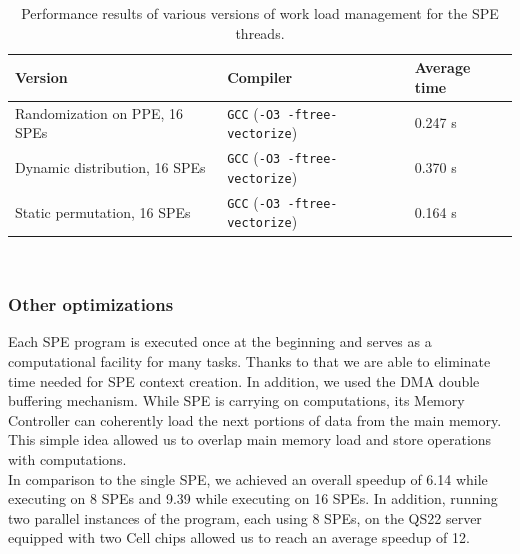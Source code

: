 \begin{table}[htb]
\begin{footnotesize}
\caption{Performance results of various versions of work load management for the SPE threads.}
\label{tab:t2}
\newcommand{\m}{\hphantom{$-$}}
\newcommand{\cc}[1]{\multicolumn{1}{c}{#1}}
\renewcommand{\tabcolsep}{0.5pc} %
\renewcommand{\arraystretch}{1.2} %
\begin{tabular}{@{}lll}
\hline
\textbf{Version} & \textbf{Compiler} & \textbf{Average time} \\
\hline
Randomization on PPE, 16 SPEs & \texttt{GCC} (\texttt{-O3 -ftree-vectorize}) & 0.247 s \\
Dynamic distribution, 16 SPEs & \texttt{GCC} (\texttt{-O3 -ftree-vectorize}) &  0.370 s \\
Static permutation, 16 SPEs & \texttt{GCC} (\texttt{-O3 -ftree-vectorize}) & 0.164 s \\
\hline
\end{tabular}\\[2pt]
\end{footnotesize}
\end{table}

\subsubsection{Other optimizations}
Each SPE program is executed once at the beginning and serves as a computational
facility for many tasks.
Thanks to that we are able to eliminate time needed for SPE context creation.
In addition, we used the DMA double buffering
mechanism.
While SPE is carrying on computations, its Memory Controller can coherently load
the next portions of data from the main memory.
This simple idea allowed us to overlap main memory load and store operations with computations.\\
In comparison to the single SPE, we achieved an overall speedup of 6.14 while
executing on 8 SPEs and 9.39 while executing on 16 SPEs.
In addition, running two parallel instances of the \prog{} program, each using 8 SPEs, on the QS22 server equipped with two Cell chips allowed us to reach an average speedup of 12.

